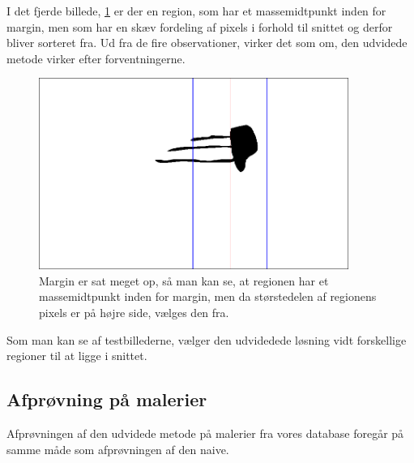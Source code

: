 I det fjerde billede, \ref{bleksprutte_test} er der en region, som har
et massemidtpunkt inden for margin, men som har en skæv fordeling af pixels
i forhold til snittet og derfor bliver sorteret fra. Ud fra de fire
observationer, virker det som om, den udvidede metode virker efter
forventningerne.

\begin{figure}[h!!]
	\begin{center}
		\includegraphics[width=0.9\textwidth,angle=0]{afsnit/afprovning/billeder/udvidet_losning/udvidet_bleksprutte_test.png}
	\end{center}
	\caption[]{Margin er sat meget op, så man kan se, at regionen har et massemidtpunkt inden for margin, men da størstedelen af regionens pixels er på højre side, vælges den fra.}
	\label{bleksprutte_test}
\end{figure}

Som man kan se af testbillederne, vælger den udvidedede løsning vidt
forskellige regioner til at ligge i snittet. 
\clearpage


\subsection{Afprøvning på malerier}
Afprøvningen af den udvidede metode på malerier fra vores database
foregår på samme måde som afprøvningen af den naive.

